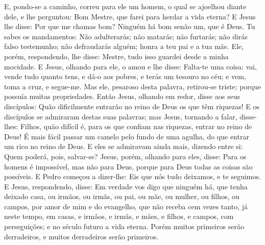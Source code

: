 E, pondo-se a caminho, correu para ele um homem, o qual se
ajoelhou diante dele, e lhe perguntou: Bom Mestre, que farei para
herdar a vida eterna? E Jesus lhe disse: Por que me chamas
bom? Ninguém há bom senão um, que é Deus. Tu sabes os
mandamentos: Não adulterarás; não matarás; não furtarás; não dirás
falso testemunho; não defraudarás alguém; honra a teu pai e a tua
mãe. Ele, porém, respondendo, lhe disse: Mestre, tudo isso
guardei desde a minha mocidade. E Jesus, olhando para ele, o
amou e lhe disse: Falta-te uma coisa: vai, vende tudo quanto tens, e
dá-o aos pobres, e terás um tesouro no céu; e vem, toma a cruz, e
segue-me. Mas ele, pesaroso desta palavra, retirou-se triste;
porque possuía muitas propriedades. Então Jesus, olhando em
redor, disse aos seus discípulos: Quão dificilmente entrarão no
reino de Deus os que têm riquezas! E os discípulos se
admiraram destas suas palavras; mas Jesus, tornando a falar,
disse-lhes: Filhos, quão difícil é, para os que confiam nas
riquezas, entrar no reino de Deus! É mais fácil passar um
camelo pelo fundo de uma agulha, do que entrar um rico no reino de
Deus. E eles se admiravam ainda mais, dizendo entre si: Quem
poderá, pois, salvar-se? Jesus, porém, olhando para eles,
disse: Para os homens é impossível, mas não para Deus, porque para
Deus todas as coisas são possíveis. E Pedro começou a
dizer-lhe: Eis que nós tudo deixamos, e te seguimos. E Jesus,
respondendo, disse: Em verdade vos digo que ninguém há, que tenha
deixado casa, ou irmãos, ou irmãs, ou pai, ou mãe, ou mulher, ou
filhos, ou campos, por amor de mim e do evangelho, que não
receba cem vezes tanto, já neste tempo, em casas, e irmãos, e irmãs,
e mães, e filhos, e campos, com perseguições; e no século futuro a
vida eterna. Porém muitos primeiros serão derradeiros, e
muitos derradeiros serão primeiros.

